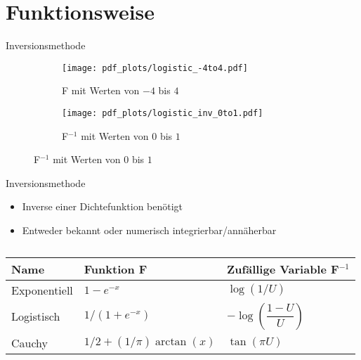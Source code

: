 \section{Funktionsweise}

\begin{frame}{Inversionsmethode}
	\begin{figure}
		\begin{subfigure}{.45\textwidth}
			\centering
			\texttt{[image: pdf\_plots/logistic\_-4to4.pdf]}
            \caption{F mit Werten von $-4$ bis $4$}
		\end{subfigure}
		\begin{subfigure}{.45\textwidth}
			\centering
			\texttt{[image: pdf\_plots/logistic\_inv\_0to1.pdf]}
            \caption{F$^{-1}$ mit Werten von $0$ bis $1$}
		\end{subfigure}
	\end{figure}
\end{frame}

\begin{frame}{Inversionsmethode}
    \begin{itemize}
        \item Inverse einer Dichtefunktion benötigt 
        \item Entweder bekannt %
            oder numerisch integrierbar/annäherbar
    \end{itemize}
    \begin{table}%
        \centering
        \begin{tabular}{l|l|l}
            Name         & Funktion F & Zufällige Variable F$^{-1}$ \\
            \hline\hline %
            Exponentiell & $1 - e^{-x}$ & $\log(1/U)$ \\ %
            Logistisch   & $1 / (1 + e^{-x})$ & $-\log(\dfrac{1-U}{U})$ \\ %
            Cauchy       & $1/2 + (1/\pi) \arctan(x)$ & $\tan(\pi U)$
        \end{tabular}
        \caption{\cite{devroye-non_uniform_random_variate-1986}}
    \end{table}
\end{frame}

